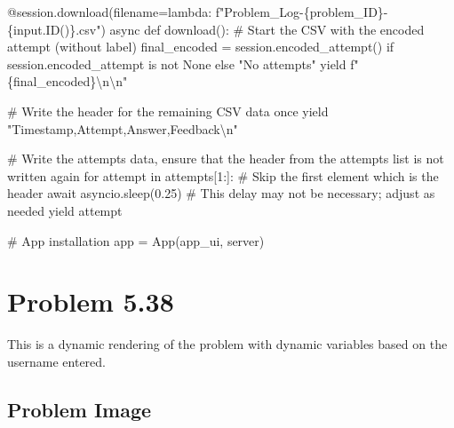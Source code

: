 \documentclass[
  letterpaper,
  DIV=11,
  numbers=noendperiod]{scrreprt}
\newenvironment{Shaded}{\begin{snugshade}}{\end{snugshade}}
\newcommand{\NormalTok}[1]{\textcolor[rgb]{0.00,0.23,0.31}{#1}}
\begin{document}
\begin{Shaded}
\begin{Highlighting}[]
\NormalTok{    @session.download(filename=lambda: f"Problem\_Log{-}\{problem\_ID\}{-}\{input.ID()\}.csv")}
\NormalTok{    async def download():}
\NormalTok{        \# Start the CSV with the encoded attempt (without label)}
\NormalTok{        final\_encoded = session.encoded\_attempt() if session.encoded\_attempt is not None else "No attempts"}
\NormalTok{        yield f"\{final\_encoded\}\textbackslash{}n\textbackslash{}n"}
        
\NormalTok{        \# Write the header for the remaining CSV data once}
\NormalTok{        yield "Timestamp,Attempt,Answer,Feedback\textbackslash{}n"}
        
\NormalTok{        \# Write the attempts data, ensure that the header from the attempts list is not written again}
\NormalTok{        for attempt in attempts[1:]:  \# Skip the first element which is the header}
\NormalTok{            await asyncio.sleep(0.25)  \# This delay may not be necessary; adjust as needed}
\NormalTok{            yield attempt}


\NormalTok{\# App installation}
\NormalTok{app = App(app\_ui, server)}
\end{Highlighting}
\end{Shaded}

\chapter*{Problem 5.38}\label{problem-5.38}


This is a dynamic rendering of the problem with dynamic variables based
on the username entered.

\section*{Problem Image}\label{problem-image-51}

\end{document}
